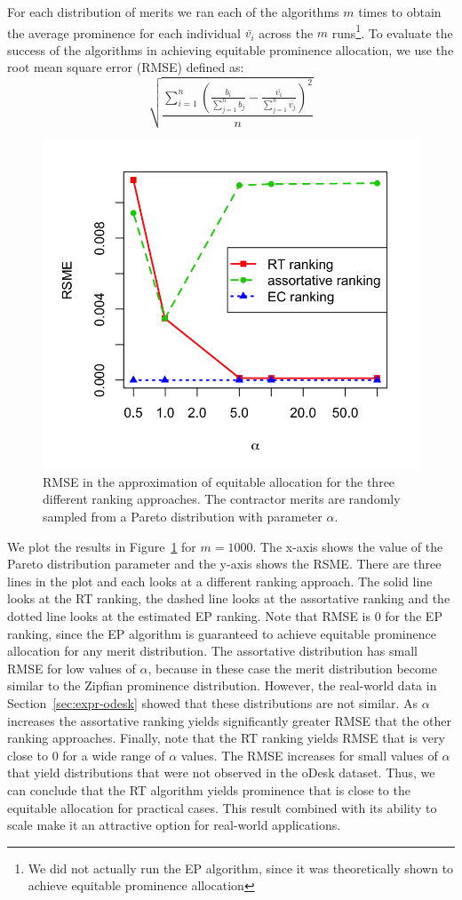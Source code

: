 For each distribution of merits we ran each of the algorithms $m$
times to obtain the average prominence for each individual $\bar{v_i}$
across the $m$ runs\footnote{We did not actually run the EP algorithm,
  since it was theoretically shown to achieve equitable prominence
  allocation}. To evaluate the success of the algorithms in achieving
equitable prominence allocation, we use the root mean square error
(RMSE) defined as:
\[
\sqrt{\frac{\sum_{i=1}^n\left(\frac{b_i}{\sum_{j=1}^n
        b_j}-\frac{\bar{v_i}}{\sum_{j=1}^n \bar{v_j}}\right)^2}{n}}
\]
\begin{figure}[t]
  \centering
  \includegraphics[width=0.6\columnwidth]{../simulations/results/approximation.png}
  \caption{RMSE in the approximation of equitable allocation for the
    three different ranking approaches. The contractor merits are
    randomly sampled from a Pareto distribution with parameter $\alpha$.}
  \label{fig:approximation}
\end{figure} 
We plot the results in Figure~\ref{fig:approximation} for
$m=1000$. The x-axis shows the value of the Pareto distribution
parameter and the y-axis shows the RSME. There are three lines in the
plot and each looks at a different ranking approach. The solid line
looks at the RT ranking, the dashed line looks at the assortative
ranking and the dotted line looks at the estimated EP ranking. Note
that RMSE is 0 for the EP ranking, since the EP algorithm is
guaranteed to achieve equitable prominence allocation for any merit
distribution. The assortative distribution has small RMSE for low
values of $\alpha$, because in these case the merit distribution
become similar to the Zipfian prominence distribution. However, the
real-world data in Section~\ref{sec:expr-odesk} showed that these
distributions are not similar. As $\alpha$ increases the assortative
ranking yields significantly greater RMSE that the other ranking
approaches. Finally, note that the RT ranking yields RMSE that is very
close to $0$ for a wide range of $\alpha$ values. The RMSE increases
for small values of $\alpha$ that yield distributions that were not
observed in the oDesk dataset. Thus, we can conclude that the RT
algorithm yields prominence that is close to the equitable allocation
for practical cases. This result combined with its ability to scale
make it an attractive option for real-world applications.


